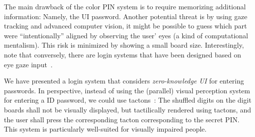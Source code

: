 \documentclass[12pt,onecolumn]{article}
\begin{document}
The main drawback of the color PIN system is to require memorizing additional information: Namely, the UI password. 
Another potential threat is by using gaze tracking and advanced computer vision, it might be possible to guess which part were ``intentionally''  aligned by observing the user' eyes (a kind of computational mentalism). This risk is minimized by showing a small board size.
Interestingly, note that conversely, there are login systems that have been designed based on eye gaze input~\cite{GazedBasedPWD-2007}. 

We have presented a login system that considers {\em zero-knowledge UI} for entering passwords.
In perspective, instead of using the (parallel) visual perception system for entering a ID password, we could use  tactons~\cite{PINTacton-2010}: 
The shuffled digits on the digit boards shall not be visually displayed, but tactilically rendered using tactons, and the user shall press the corresponding tacton corresponding to the secret PIN. This system is particularly well-suited for visually impaired people.
\end{document}

